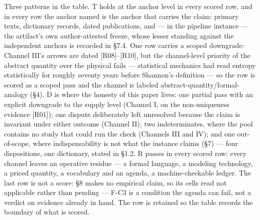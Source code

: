 \documentclass[11pt,a4paper]{article}
\begin{document}
Three patterns in the table. T holds at the anchor level in every scored row, and in every row the anchor named is the anchor that carries the claim: primary texts, dictionary records, dated publications, and — in the pipeline instance — the artifact's own author-attested freeze, whose lesser standing against the independent anchors is recorded in §7.4. One row carries a scoped downgrade: Channel III's arrows are dated [R08]–[R10], but the channel-level priority of the abstract quantity over the physical fails — statistical mechanics had read entropy statistically for roughly seventy years before Shannon's definition — so the row is scored as a scoped pass and the channel is labeled abstract-quantity/formal-analogy (§4). D is where the honesty of this paper lives: one partial pass with an explicit downgrade to the supply level (Channel I, on the non-uniqueness evidence [R01]); one dispute deliberately left unresolved because the claim is invariant under either outcome (Channel II); two indeterminates, where the pool contains no study that could run the check (Channels III and IV); and one out-of-scope, where indispensability is not what the instance claims (§7) — four dispositions, one dictionary, stated in §1.2. R passes in every scored row: every channel leaves an operative residue — a formal language, a modeling technology, a priced quantity, a vocabulary and an agenda, a machine-checkable ledger. The last row is not a score: §8 makes no empirical claim, so its cells read not applicable rather than pending — F-C3 is a condition the agenda can fail, not a verdict on evidence already in hand. The row is retained so the table records the boundary of what is scored.
\end{document}
